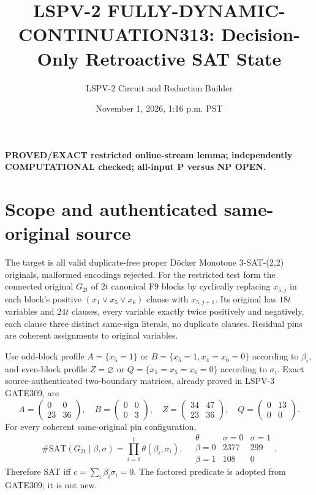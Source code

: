 \documentclass[11pt]{article}
\title{LSPV-2 FULLY-DYNAMIC-CONTINUATION313: Decision-Only Retroactive SAT State}
\author{LSPV-2 Circuit and Reduction Builder}
\date{November 1, 2026, 1:16 p.m. PST}
\begin{document}
\maketitle
\noindent\textbf{PROVED/EXACT restricted online-stream lemma; independently COMPUTATIONAL checked; all-input P versus NP OPEN.}
\section{Scope and authenticated same-original source}
The target is all valid duplicate-free proper D\"ocker Monotone 3-SAT-(2,2) originals, malformed encodings rejected. For the restricted test form the connected original $G_{2t}$ of $2t$ canonical F9 blocks by cyclically replacing $x_{5,j}$ in each block's positive $(x_1\vee x_5\vee x_6)$ clause with $x_{5,j+1}$. Its original has $18t$ variables and $24t$ clauses, every variable exactly twice positively and negatively, each clause three distinct same-sign literals, no duplicate clauses. Residual pins are coherent assignments to original variables.

Use odd-block profile $A=\{x_5=1\}$ or $B=\{x_5=1,x_4=x_6=0\}$ according to $\beta_i$, and even-block profile $Z=\varnothing$ or $Q=\{x_1=x_5=x_6=0\}$ according to $\sigma_i$. Exact source-authenticated two-boundary matrices, already proved in LSPV-3 GATE309, are
\[
 A=\begin{pmatrix}0&0\\23&36\end{pmatrix},\quad
 B=\begin{pmatrix}0&0\\0&3\end{pmatrix},\quad
 Z=\begin{pmatrix}34&47\\23&36\end{pmatrix},\quad
 Q=\begin{pmatrix}0&13\\0&0\end{pmatrix}.
\]
For every coherent same-original pin configuration,
\[
 \#\mathrm{SAT}(G_{2t}\mid\beta,\sigma)=\prod_{i=1}^t\theta(\beta_i,\sigma_i),
\quad
 \begin{array}{c|cc}
 \theta&\sigma=0&\sigma=1\\\hline
 \beta=0&2377&299\\\beta=1&108&0
 \end{array}.
\]
Therefore SAT iff $c=\sum_i\beta_i\sigma_i=0$. The factored predicate is adopted from GATE309; it is not new.
\end{document}

